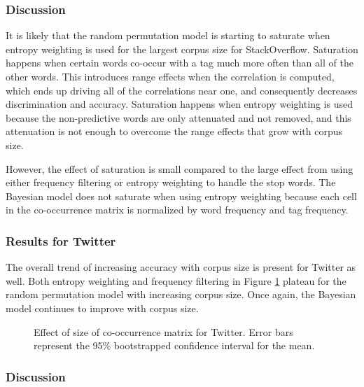 \documentclass[man,floatsintext,donotrepeattitle]{apa6}
\begin{document}
\subsubsection{Discussion}

It is likely that the random permutation model is starting to saturate when entropy weighting is used for the largest corpus size for StackOverflow.
Saturation happens when certain words co-occur with a tag much more often than all of the other words.
This introduces range effects when the correlation is computed, which ends up driving all of the correlations near one, and consequently decreases discrimination and accuracy.
Saturation happens when entropy weighting is used because the non-predictive words are only attenuated and not removed, and this attenuation is not enough to overcome the range effects that grow with corpus size.

However, the effect of saturation is small compared to the large effect from using either frequency filtering or entropy weighting to handle the stop words.
The Bayesian model does not saturate when using entropy weighting because each cell in the co-occurrence matrix is normalized by word frequency and tag frequency.

\subsubsection{Results for Twitter}

The overall trend of increasing accuracy with corpus size is present for Twitter as well.
Both entropy weighting and frequency filtering in Figure \ref{figContextDocumentSizeT} plateau for the random permutation model with increasing corpus size.
Once again, the Bayesian model continues to improve with corpus size.

\begin{figure}[!htbp]
  \caption{
    Effect of size of co-occurrence matrix for Twitter.
    Error bars represent the 95\% bootstrapped confidence interval for the mean.
  }
  \label{figContextDocumentSizeT}
\end{figure}

\subsubsection{Discussion}
\end{document}
